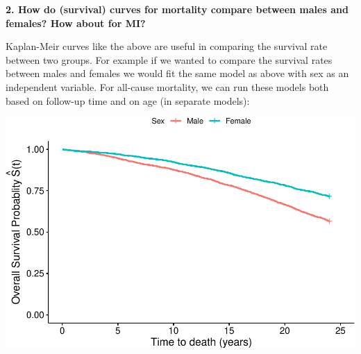 \documentclass[
]{book}
\newenvironment{Shaded}{\begin{snugshade}}{\end{snugshade}}
\newcommand{\DataTypeTok}[1]{\textcolor[rgb]{0.13,0.29,0.53}{#1}}
\newcommand{\KeywordTok}[1]{\textcolor[rgb]{0.13,0.29,0.53}{\textbf{#1}}}
\newcommand{\NormalTok}[1]{#1}
\newcommand{\OperatorTok}[1]{\textcolor[rgb]{0.81,0.36,0.00}{\textbf{#1}}}
\newcommand{\StringTok}[1]{\textcolor[rgb]{0.31,0.60,0.02}{#1}}
\begin{document}
\textbf{2. How do (survival) curves for mortality compare between males and females? How about for MI?}

Kaplan-Meir curves like the above are useful in comparing the survival rate between two groups. For example if we wanted to compare the survival rates between males and females we would fit the same model as above with sex as an independent variable. For all-cause mortality, we can run these models both based on follow-up time and on age (in separate models):

\begin{Shaded}
\end{Shaded}

\includegraphics{adv_epi_analysis_files/figure-latex/unnamed-chunk-203-1.pdf}
\end{document}
